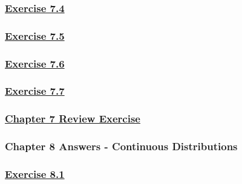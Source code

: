 \documentclass[
  11pt,
]{book}
\begin{document}
\subsubsection*{\texorpdfstring{\hyperref[ex74q]{Exercise 7.4}}{Exercise 7.4}}\label{exercise-7.4-1}

\subsubsection*{\texorpdfstring{\hyperref[ex75q]{Exercise 7.5}}{Exercise 7.5}}\label{exercise-7.5-1}

\subsubsection*{\texorpdfstring{\hyperref[ex76q]{Exercise 7.6}}{Exercise 7.6}}\label{exercise-7.6-1}

\subsubsection*{\texorpdfstring{\hyperref[ex77q]{Exercise 7.7}}{Exercise 7.7}}\label{exercise-7.7-1}

\subsubsection*{\texorpdfstring{\hyperref[re7q]{Chapter 7 Review Exercise}}{Chapter 7 Review Exercise}}\label{chapter-7-review-exercise}

\subsubsection*{Chapter 8 Answers - Continuous Distributions}\label{chapter-8-answers---continuous-distributions}

\subsubsection*{\texorpdfstring{\hyperref[ex81q]{Exercise 8.1}}{Exercise 8.1}}\label{exercise-8.1-1}
\end{document}
